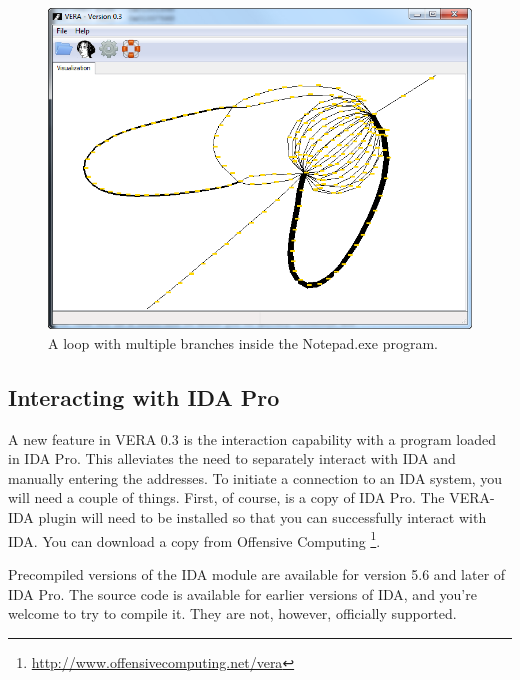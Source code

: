 \documentclass[11pt]{article}
\begin{document}
\begin{figure}[htb]
  \centering
  \includegraphics[width=5.0in]{vera-notepad-trace-zoom2.png}
  \caption{A loop with multiple branches inside the Notepad.exe program.}\label{fig:notepad-loop}
\end{figure}

\subsection{Interacting with IDA Pro}

A new feature in VERA 0.3 is the interaction capability with a program
loaded in IDA Pro. This alleviates the need to separately interact
with IDA and manually entering the addresses. To initiate a connection
to an IDA system, you will need a couple of things. First, of course,
is a copy of IDA Pro. The VERA-IDA plugin will need to be installed so that you
can successfully interact with IDA. You can download a copy from
Offensive Computing
\footnote{\url{http://www.offensivecomputing.net/vera}}. 

Precompiled versions of the IDA module are available for version 5.6
and later of IDA Pro. The source code is available for earlier
versions of IDA, and you're welcome to try to compile it. They are
not, however, officially supported.
\end{document}
